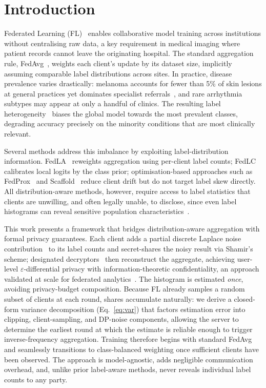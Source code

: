 \documentclass[runningheads]{llncs}
\begin{document}
\section{Introduction}

Federated Learning (FL)~\cite{ref_mcmahan2017} enables collaborative model training across institutions without centralising raw data, a key requirement in medical imaging where patient records cannot leave the originating hospital.
The standard aggregation rule, FedAvg~\cite{ref_mcmahan2017}, weights each client's update by its dataset size, implicitly assuming comparable label distributions across sites.
In practice, disease prevalence varies drastically: melanoma accounts for fewer than 5\% of skin lesions at general practices yet dominates specialist referrals~\cite{ref_fl_medical}, and rare arrhythmia subtypes may appear at only a handful of clinics.
The resulting label heterogeneity~\cite{ref_kairouz2021} biases the global model towards the most prevalent classes, degrading accuracy precisely on the minority conditions that are most clinically relevant.

Several methods address this imbalance by exploiting label-distribution information.
FedLA~\cite{ref_fedla} reweights aggregation using per-client label counts; FedLC~\cite{ref_fedlc} calibrates local logits by the class prior; optimisation-based approaches such as FedProx~\cite{ref_fedprox} and Scaffold~\cite{ref_scaffold} reduce client drift but do not target label skew directly.
All distribution-aware methods, however, require access to label statistics that clients are unwilling, and often legally unable, to disclose, since even label histograms can reveal sensitive population characteristics~\cite{ref_dlg,ref_label_leakage}.

This work presents a framework that bridges distribution-aware aggregation with formal privacy guarantees.
Each client adds a partial discrete Laplace noise contribution~\cite{ref_fed_heatmap} to its label counts and secret-shares the noisy result via Shamir's scheme; designated decryptors~\cite{ref_flamingo} then reconstruct the aggregate, achieving user-level $\varepsilon$-differential privacy with information-theoretic confidentiality, an approach validated at scale for federated analytics~\cite{ref_fed_heatmap}.
The histogram is estimated \emph{once}, avoiding privacy-budget composition.
Because FL already samples a random subset of clients at each round, shares accumulate naturally: we derive a closed-form variance decomposition (Eq.~\ref{eq:var}) that factors estimation error into clipping, client-sampling, and DP-noise components, allowing the server to determine the earliest round at which the estimate is reliable enough to trigger inverse-frequency aggregation.
Training therefore begins with standard FedAvg and seamlessly transitions to class-balanced weighting once sufficient clients have been observed.
The approach is model-agnostic, adds negligible communication overhead, and, unlike prior label-aware methods, never reveals individual label counts to any party.
\end{document}
